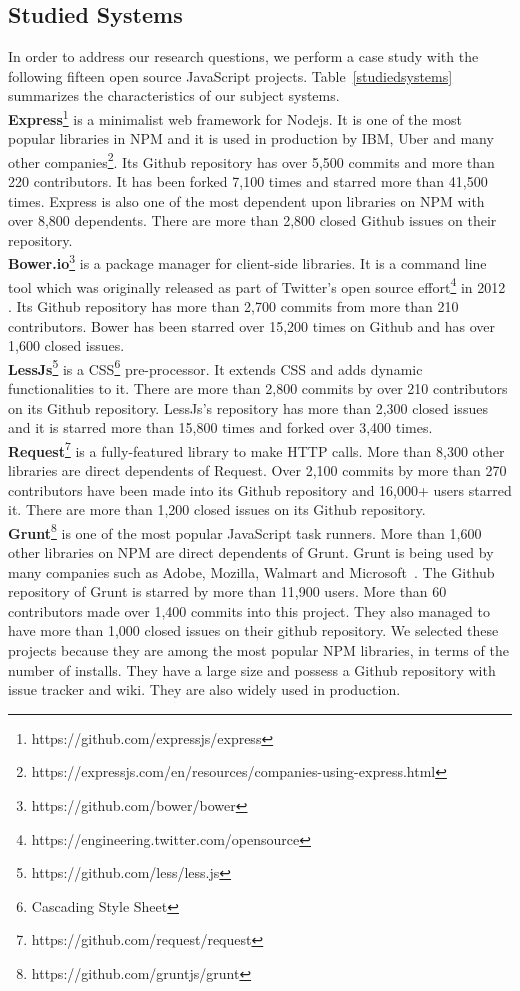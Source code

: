 \documentclass[smallcondensed]{svjour3}
\begin{document}
\subsection{Studied Systems}
In order to address our research questions, we perform a case study with the following fifteen open source JavaScript projects. Table~\ref{studiedsystems} summarizes the characteristics of our subject systems.\\
\textbf{Express}\footnote{https://github.com/expressjs/express} is a minimalist web framework for Nodejs. It is one of the most popular libraries in NPM \cite{mardan2014express} and it is used in production by IBM, Uber and many other companies\footnote{https://expressjs.com/en/resources/companies-using-express.html}. Its Github repository has over 5,500 commits and more than 220 contributors. It has been forked 7,100 times and starred more than 41,500 times. Express is also one of the most dependent upon libraries on NPM with over 8,800 dependents. There are more than 2,800 closed Github issues on their repository.\\
\textbf{Bower.io}\footnote{https://github.com/bower/bower} is a package manager for client-side libraries.
It is a command line tool which was originally released as part of Twitter's open source effort\footnote{https://engineering.twitter.com/opensource} in 2012 \cite{bowerabout}. Its Github repository has more than 2,700 commits from more than 210 contributors. Bower has been starred over 15,200 times on Github and has over 1,600 closed issues.\\ 
\textbf{LessJs}\footnote{https://github.com/less/less.js} is a CSS\footnote{Cascading Style Sheet} pre-processor. It extends CSS and adds dynamic functionalities to it. There are more than 2,800 commits by over 210 contributors on its Github repository. LessJs's repository has more than 2,300 closed issues and it is starred more than 15,800 times and forked over 3,400 times.\\ 
\textbf{Request}\footnote{https://github.com/request/request} is a fully-featured library to make HTTP calls. More than 8,300 other libraries are direct dependents of Request. Over 2,100 commits by more than 270 contributors have been made into its Github repository and 16,000+ users starred it. There are more than 1,200 closed issues on its Github repository.\\ 
\textbf{Grunt}\footnote{https://github.com/gruntjs/grunt} is one of the most popular JavaScript task runners. More than 1,600 other libraries on NPM are direct dependents of Grunt. Grunt is being used by many companies such as Adobe, Mozilla, Walmart and Microsoft~\cite{gruntusers}. The Github repository of Grunt is starred by more than 11,900 users. More than 60 contributors made over 1,400 commits into this project. They also managed to have more than 1,000 closed issues on their github repository. We selected these projects because they are among the most popular NPM libraries, in terms of the number of installs. They have a large size and possess a Github repository with issue tracker and wiki. They are also widely used in production.\\
\end{document}
